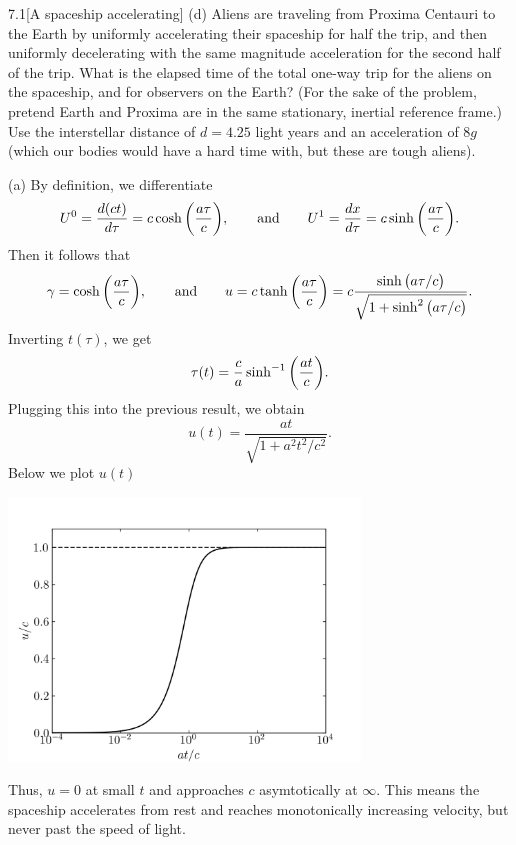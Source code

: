 \documentclass[12pt]{article}
\begin{document}
\begin{problem}{7.1}[A spaceship accelerating]
(d) Aliens are traveling from Proxima Centauri to the Earth by uniformly
accelerating their spaceship for half the trip, and then uniformly decelerating
with the same magnitude acceleration for the second half of the trip. What is
the elapsed time of the total one-way trip for the aliens on the spaceship, and
for observers on the Earth? (For the sake of the problem, pretend Earth and
Proxima are in the same stationary, inertial reference frame.) Use the
interstellar distance of $d=4.25$ light years and an acceleration of $8g$ (which
our bodies would have a hard time with, but these are tough aliens).
\begin{solution}
(a) By definition, we differentiate
\begin{equation}
    U^0=\frac{d(ct)}{d\tau}
    =c\cosh\qty(\frac{a\tau}{c}),\qquad\text{and}
    \qquad
    U^1=\frac{dx}{d\tau}=c\sinh\qty(\frac{a\tau}{c}).
\end{equation}
Then it follows that
\begin{equation}
    \gamma=\cosh\qty(\frac{a\tau}{c}),\qquad\text{and}\qquad
    u=c\tanh\qty(\frac{a\tau}{c})
    =c\frac{\sinh\qty(a\tau/c)}{\sqrt{1+\sinh^2\qty(a\tau/c)}}.
\end{equation}
Inverting $t(\tau)$, we get
\begin{equation}
    \tau(t)=\frac{c}{a}\sinh^{-1}\qty(\frac{at}{c}).
\end{equation}
Plugging this into the previous result, we obtain
\begin{equation}
    u(t)=\frac{at}{\sqrt{1+a^2t^2/c^2}}.
\end{equation}
Below we plot $u(t)$
\begin{center}
    \includegraphics[width=0.7\textwidth]{p1a.png} 
\end{center}
Thus, $u=0$ at small $t$ and approaches $c$ asymtotically at $\infty$. This
means the spaceship accelerates from rest and reaches monotonically increasing
velocity, but never past the speed of light.


\end{solution}
\end{problem}
\end{document}
